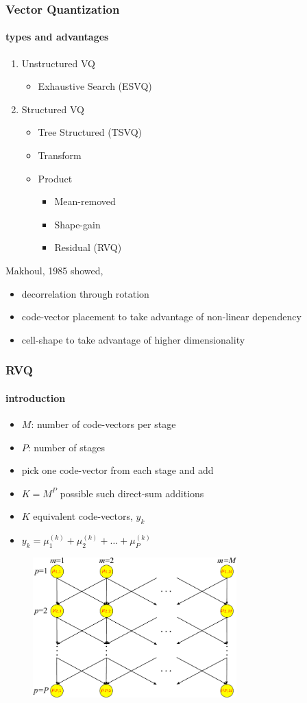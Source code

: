 \begin{frame}
\frametitle{Vector Quantization}
\framesubtitle{types and advantages}
\mypagenum
	\begin{enumerate}
		\item Unstructured VQ
			\begin{itemize}
				\item Exhaustive Search (ESVQ)
			\end{itemize}
		\item Structured VQ
		\begin{itemize}
			\item Tree Structured (TSVQ)
			\item Transform
			\item Product
				\begin{itemize}
					\item Mean-removed
					\item Shape-gain
					\item Residual (RVQ)
				\end{itemize}
		\end{itemize}
	\end{enumerate}
	\vspace{0.2in}
	Makhoul, 1985 showed,
	\begin{itemize}
	\item decorrelation through rotation
	\item code-vector placement to take advantage of non-linear dependency
	\item cell-shape to take advantage of higher dimensionality
	\end{itemize}
\end{frame}


\begin{frame}
\frametitle{RVQ}
\framesubtitle{introduction}
\mypagenum
\begin{itemize}
\item $M$: number of code-vectors per stage
\item $P$: number of stages
\item pick one code-vector from each stage and add
\item $K=M^P$ possible such direct-sum additions
\item $K$ equivalent code-vectors, $y_k$
\item $y_k = \mu_1^{(k)} + \mu_2^{(k)} + \ldots + \mu_P^{(k)}$
\end{itemize}
\begin{figure}[t]
\centering
\includegraphics[width=0.7\textwidth]{thesis/RVQ.pdf}
\end{figure}
\end{frame}


